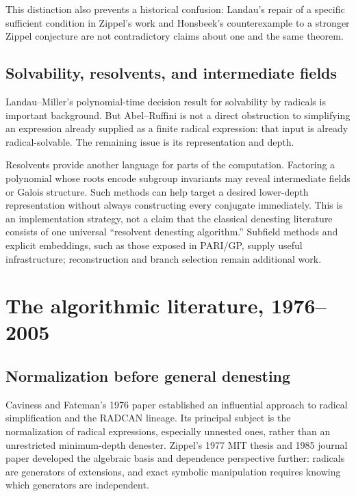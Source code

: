 \documentclass[11pt,a4paper]{article}
\theoremstyle{definition}
\theoremstyle{remark}
\numberwithin{equation}{section}
\begin{document}
This distinction also prevents a historical confusion: Landau's repair of a specific sufficient condition in Zippel's work and Honsbeek's counterexample to a stronger Zippel conjecture are not contradictory claims about one and the same theorem.

\subsection{Solvability, resolvents, and intermediate fields}

Landau--Miller's polynomial-time decision result for solvability by radicals is important background. But Abel--Ruffini is not a direct obstruction to simplifying an expression already supplied as a finite radical expression: that input is already radical-solvable. The remaining issue is its representation and depth.\cite{landaumiller}

Resolvents provide another language for parts of the computation. Factoring a polynomial whose roots encode subgroup invariants may reveal intermediate fields or Galois structure. Such methods can help target a desired lower-depth representation without always constructing every conjugate immediately. This is an implementation strategy, not a claim that the classical denesting literature consists of one universal ``resolvent denesting algorithm.'' Subfield methods and explicit embeddings, such as those exposed in PARI/GP, supply useful infrastructure; reconstruction and branch selection remain additional work.\cite{pari,kluners,cohen}

\section{The algorithmic literature, 1976--2005}
\label{sec:algorithms}

\subsection{Normalization before general denesting}

Caviness and Fateman's 1976 paper established an influential approach to radical simplification and the RADCAN lineage. Its principal subject is the normalization of radical expressions, especially unnested ones, rather than an unrestricted minimum-depth denester. Zippel's 1977 MIT thesis and 1985 journal paper developed the algebraic basis and dependence perspective further: radicals are generators of extensions, and exact symbolic manipulation requires knowing which generators are independent.\cite{cavinessfateman,zippelthesis,zippel}
\end{document}
